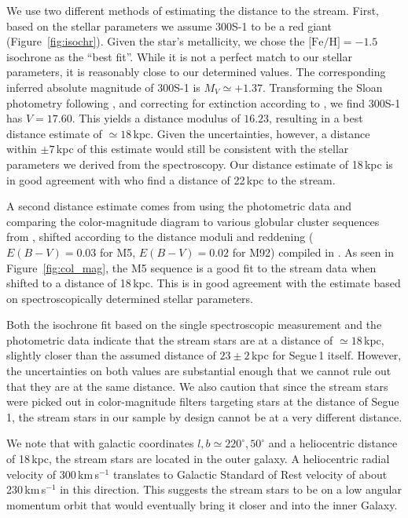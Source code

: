 \documentclass{emulateapj}
\begin{document}
We use two different methods of estimating the distance to the
stream. First, based on the stellar parameters we assume 300S-1 to
be a red giant (Figure~\ref{fig:isochr}). Given the star's
metallicity, we chose the $\mbox{[Fe/H]} = -1.5$ isochrone as the ``best
fit''. While it is not a perfect match to our stellar parameters, it
is reasonably close to our determined values. The corresponding
inferred absolute magnitude of 300S-1 is $M_V \simeq
+1.37$. Transforming the Sloan photometry following
\citet{Jordi2006}, and correcting for extinction according to
\citet{Schlegel1998}, we find 300S-1 has $V = 17.60$. This yields a
distance modulus of $16.23$, resulting in a best distance estimate of
$\simeq 18$\,kpc. Given the uncertainties, however, a distance within
$\pm 7$\,kpc of this estimate would still be consistent with the
stellar parameters we derived from the spectroscopy. Our distance
estimate of 18\,kpc is in good agreement with \citet{Simon2011} who
find a distance of 22\,kpc to the stream.

A second distance estimate comes from using the photometric data and
comparing the color-magnitude diagram to various globular cluster
sequences from \citet{An2008}, shifted according to the distance
moduli and reddening ($E(B-V)=0.03$ for M5, $E(B-V)=0.02$ for M92)
compiled in \citet{Harris1996}. As seen in Figure~\ref{fig:col_mag},
the M5 sequence is a good fit to the stream data when shifted to a
distance of 18\,kpc. This is in good agreement with the estimate based
on spectroscopically determined stellar parameters.

Both the isochrone fit based on the single spectroscopic measurement
and the photometric data indicate that the stream stars are at a
distance of $\simeq 18$\,kpc, slightly closer than the assumed
distance of $23 \pm 2$\,kpc \citep{Belokurov2007} for Segue\,1
itself. However, the uncertainties on both values are substantial
enough that we cannot rule out that they are at the same distance. We
also caution that since the stream stars were picked out in
color-magnitude filters targeting stars at the distance of Segue\,1, the
stream stars in our sample by design cannot be at a very different
distance.

We note that with galactic coordinates $l, b \simeq 220^{\circ},
50^{\circ}$ and a heliocentric distance of 18\,kpc, the stream stars
are located in the outer galaxy. A heliocentric radial velocity of
300\,km\,s$^{-1}$ translates to Galactic Standard of Rest velocity of
about 230\,km\,s$^{-1}$ in this direction. This suggests the stream
stars to be on a low angular momentum orbit that would eventually
bring it closer and into the inner Galaxy.
\end{document}
